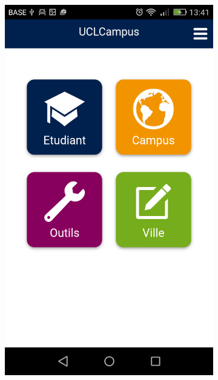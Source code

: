 \documentclass{eplmastersthesis}
\begin{document}
\begin{figure}
    \centering
\begin{subfigure}[b]{0.3\textwidth}
        \includegraphics[width=\textwidth]{Images/Application_screens/Screenshot_2016-06-06-13-41-26.png}
    \end{subfigure}
    ~ %
    \begin{subfigure}[b]{0.3\textwidth}

\end{subfigure}
\end{figure}
\end{document}
